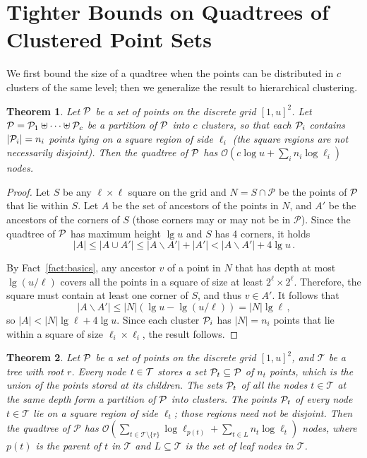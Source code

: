 \documentclass{elsarticle}
\newtheorem{theorem}{Theorem}
\newcommand{\Oh}[1]
  {\ensuremath{\mathcal{O}\!\left( {#1} \right)}}
\begin{document}
\section{Tighter Bounds on Quadtrees of Clustered Point Sets}
\label{sec:space}

We first bound the size of a quadtree when the points can be distributed in $c$ clusters of the same level; then we generalize the result to hierarchical clustering.

\begin{theorem}
\label{thm:space}
Let $\cal P$ be a set of points on the discrete grid $[1,u]^2$.
Let ${\cal P} = {\cal P}_1 \uplus \cdots \uplus {\cal P}_c$ be a partition of
$\cal P$ into $c$ clusters, so that each
${\cal P}_i$ contains $|{\cal P}_i| = n_i$ points lying on a square region of
side $\ell_i$ (the square regions are not necessarily disjoint).
Then the quadtree of $\cal P$ has $\Oh{c \log u + \sum_i n_i \log \ell_i}$ nodes.
\end{theorem}

\begin{proof}
Let $S$ be any \(\ell \times \ell\) square on the grid and
\(N = S \cap \mathcal{P}\) be the points of $\cal P$ that lie within $S$. 
Let $A$ be the set of ancestors of the points in $N$, and
$A'$ be the ancestors of the corners of $S$ (those corners may or may not 
be in $\mathcal{P}$). Since the quadtree of $\cal P$ has maximum height $\lg u$
and $S$ has 4 corners, it holds 
\[|A| \leq |A \cup A'| \leq |A \backslash A'| + |A'| < |A \backslash A'| + 4 \lg u\,.\]

By Fact~\ref{fact:basics},
any ancestor $v$ of a point in $N$ that has depth at most \(\lg (u / \ell)\)
covers all the points in a square of size at least \(2^\ell \times 2^\ell\).  
Therefore, the square must contain at least one corner of $S$, and thus \(v \in A'\).  It follows that
\[|A \backslash A'| \leq |N| (\lg u - \lg (u / \ell)) = |N| \lg \ell\,,\]
so \(|A| < |N| \lg \ell + 4 \lg u\).
Since each cluster ${\cal P}_i$ has $|N|=n_i$ points that lie within a square of
size $\ell_i \times \ell_i$, the result follows.
\end{proof}



\begin{theorem} 
\label{thm:hier}
Let ${\cal P}$ be a set of points on the discrete grid $[1,u]^2$, and
$\mathcal{T}$ be a tree with root $r$. Every node $t \in \cal T$ stores a set 
${\cal P}_t \subseteq \cal P$ of $n_t$ points,
which is the union of the points stored at its children.
The sets ${\cal P}_t$ of all the nodes $t\in\mathcal{T}$ 
at the same depth form a partition of ${\cal P}$ into clusters. The points 
${\cal P}_t$ of every node $t \in \mathcal{T}$ lie on a square region of side 
$\ell_t$; those regions need not be disjoint.
Then the quadtree of $\mathcal{P}$ has $\Oh{\sum_{t \in \mathcal{T} \setminus \{r\}} \log \ell_{p(t)} + \sum_{t \in L} n_t \log \ell_t}$ nodes, where $p(t)$ is the parent of $t$ in $\mathcal{T}$ and $L \subseteq \mathcal{T}$ is the set of leaf nodes in $\mathcal{T}$.
\end{theorem}
\end{document}
